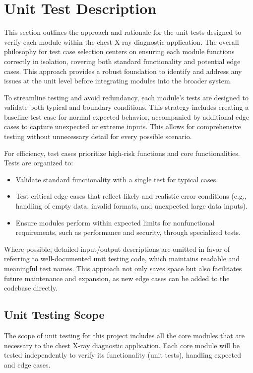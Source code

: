 \documentclass[12pt, titlepage]{article}
\begin{document}
\section{Unit Test Description}

This section outlines the approach and rationale for the unit tests designed to verify each module within the chest X-ray diagnostic application. The overall philosophy for test case selection centers on ensuring each module functions correctly in isolation, covering both standard functionality and potential edge cases. This approach provides a robust foundation to identify and address any issues at the unit level before integrating modules into the broader system.

To streamline testing and avoid redundancy, each module’s tests are designed to validate both typical and boundary conditions. This strategy includes creating a baseline test case for normal expected behavior, accompanied by additional edge cases to capture unexpected or extreme inputs. This allows for comprehensive testing without unnecessary detail for every possible scenario.

For efficiency, test cases prioritize high-risk functions and core functionalities. Tests are organized to:
\begin{itemize}
  \item Validate standard functionality with a single test for typical cases.
  \item Test critical edge cases that reflect likely and realistic error conditions (e.g., handling of empty data, invalid formats, and unexpected large data inputs).
  \item Ensure modules perform within expected limits for nonfunctional requirements, such as performance and security, through specialized tests.
\end{itemize}

Where possible, detailed input/output descriptions are omitted in favor of referring to well-documented unit testing code, which maintains readable and meaningful test names. This approach not only saves space but also facilitates future maintenance and expansion, as new edge cases can be added to the codebase directly.

\subsection{Unit Testing Scope}

The scope of unit testing for this project includes all the core modules that are necessary to the chest X-ray diagnostic application. Each core module will be tested independently to verify its functionality (unit tests), handling expected and edge cases.
\end{document}
